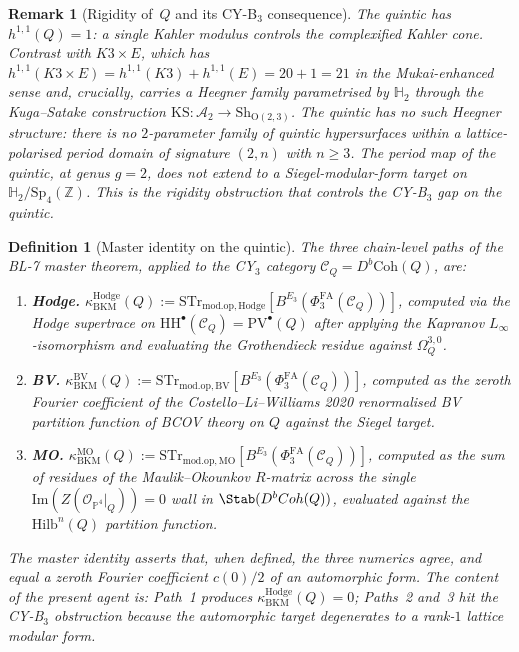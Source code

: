 \documentclass[11pt]{amsart}
\newtheorem{definition}[theorem]{Definition}
\newtheorem{remark}[theorem]{Remark}
\providecommand{\Z}{\mathbb{Z}}
\providecommand{\P}{\mathbb{P}}
\providecommand{\HH}{\mathrm{HH}}
\providecommand{\cC}{\mathcal{C}}
\providecommand{\cO}{\mathcal{O}}
\providecommand{\Sp}{\mathrm{Sp}}
\providecommand{\PhiFA}{\Phi^{\mathrm{FA}}}
\providecommand{\Coh}{\mathrm{Coh}}
\providecommand{\PV}{\mathrm{PV}}
\providecommand{\KS}{\mathrm{KS}}
\providecommand{\BV}{\mathrm{BV}}
\providecommand{\MO}{\mathrm{MO}}
\providecommand{\STr}{\mathrm{STr}}
\providecommand{\modop}{\mathrm{mod.op}}
\providecommand{\kBKM}{\kappa_{\mathrm{BKM}}}
\providecommand{\Hdg}{\mathrm{Hodge}}
\providecommand{\Hilb}{\mathrm{Hilb}}
\begin{document}
\begin{remark}[Rigidity of~$Q$ and its CY-B$_3$ consequence]
\label{rem:rigidity-quintic}
The quintic has $h^{1,1}(Q) = 1$: a single Kahler modulus
controls the complexified Kahler cone. Contrast with $K3 \times E$,
which has $h^{1,1}(K3 \times E) = h^{1,1}(K3) + h^{1,1}(E) = 20 + 1 = 21$
in the Mukai-enhanced sense and, crucially, \emph{carries a Heegner
family parametrised by $\mathbb{H}_2$} through the Kuga--Satake
construction $\KS \colon \mathcal{A}_2 \to \mathrm{Sh}_{\mathrm{O}(2,3)}$.
The quintic has no such Heegner structure: there is no
$2$-parameter family of quintic hypersurfaces within a
lattice-polarised period domain of signature $(2, n)$ with
$n \geq 3$. The period map of the quintic, at genus $g = 2$,
does not extend to a Siegel-modular-form target on
$\mathbb{H}_2 / \Sp_4(\Z)$. This is the \emph{rigidity obstruction}
that controls the CY-B$_3$ gap on the quintic.
\end{remark}

\begin{definition}[Master identity on the quintic]
\label{def:master-quintic}
The three chain-level paths of the BL-7 master theorem, applied to
the CY$_3$ category $\cC_Q = D^b\Coh(Q)$, are:
\begin{enumerate}[label=(Path~\arabic*)]
\item \textbf{Hodge.} $\kBKM^{\Hdg}(Q) := \STr_{\modop,
\Hdg}[B^{E_3}(\PhiFA_3(\cC_Q))]$, computed via the Hodge
supertrace on $\HH^\bullet(\cC_Q) = \PV^\bullet(Q)$
after applying the Kapranov $L_\infty$-isomorphism and
evaluating the Grothendieck residue against $\Omega_Q^{3,0}$.
\item \textbf{BV.} $\kBKM^{\BV}(Q) := \STr_{\modop,
\BV}[B^{E_3}(\PhiFA_3(\cC_Q))]$, computed as the zeroth Fourier
coefficient of the Costello--Li--Williams 2020 renormalised
BV partition function of BCOV theory on $Q$ against the Siegel
target.
\item \textbf{MO.} $\kBKM^{\MO}(Q) := \STr_{\modop,
\MO}[B^{E_3}(\PhiFA_3(\cC_Q))]$, computed as the sum of residues
of the Maulik--Okounkov $R$-matrix across the single
$\mathrm{Im}(Z(\cO_{\P^4}|_Q)) = 0$ wall in $\Stab(D^b\Coh(Q))$,
evaluated against the $\Hilb^n(Q)$ partition function.
\end{enumerate}
The master identity asserts that, when defined, the three numerics
agree, and equal a zeroth Fourier coefficient $c(0)/2$ of an
automorphic form. The content of the present agent is:
Path~1 produces $\kBKM^{\Hdg}(Q) = 0$; Paths~2 and~3 hit the
CY-B$_3$ obstruction because the automorphic target
degenerates to a rank-$1$ lattice modular form.
\end{definition}
\end{document}
